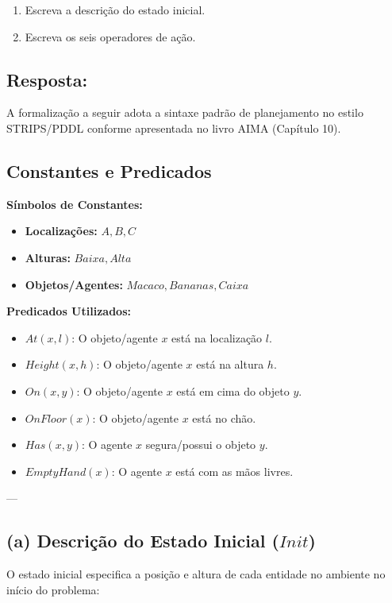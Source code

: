 \documentclass[a4paper,12pt]{article}
\begin{document}
\begin{enumerate}
	\item[\textbf{a.}] Escreva a descrição do estado inicial.
	\item[\textbf{b.}] Escreva os seis operadores de ação.
\end{enumerate}


\subsection*{Resposta:}

\bigskip

A formalização a seguir adota a sintaxe padrão de planejamento no estilo STRIPS/PDDL conforme apresentada no livro AIMA (Capítulo 10).

\subsection*{Constantes e Predicados}
\textbf{Símbolos de Constantes:}
\begin{itemize}
	\item \textbf{Localizações:} $A, B, C$
	\item \textbf{Alturas:} $Baixa, Alta$
	\item \textbf{Objetos/Agentes:} $Macaco, Bananas, Caixa$
\end{itemize}

\textbf{Predicados Utilizados:}
\begin{itemize}
	\item $At(x, l)$: O objeto/agente $x$ está na localização $l$.
	\item $Height(x, h)$: O objeto/agente $x$ está na altura $h$.
	\item $On(x, y)$: O objeto/agente $x$ está em cima do objeto $y$.
	\item $OnFloor(x)$: O objeto/agente $x$ está no chão.
	\item $Has(x, y)$: O agente $x$ segura/possui o objeto $y$.
	\item $EmptyHand(x)$: O agente $x$ está com as mãos livres.
\end{itemize}

---

\subsection*{(a) Descrição do Estado Inicial ($Init$)}

O estado inicial especifica a posição e altura de cada entidade no ambiente no início do problema:
\end{document}
